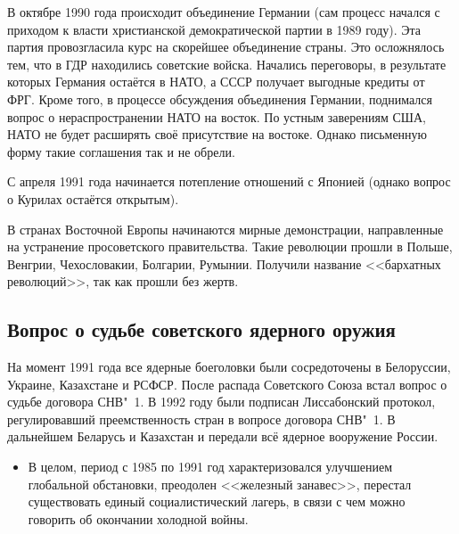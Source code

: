 В октябре 1990 года происходит объединение Германии (сам процесс начался с приходом к власти христианской демократической партии в 1989 году). Эта партия провозгласила курс на скорейшее объединение страны. Это осложнялось тем, что в ГДР находились советские войска. Начались переговоры, в результате которых Германия остаётся в НАТО, а СССР получает выгодные кредиты от ФРГ. Кроме того, в процессе обсуждения объединения Германии, поднимался вопрос о нераспространении НАТО на восток. По устным заверениям США, НАТО не будет расширять своё присутствие на востоке. Однако письменную форму такие соглашения так и не обрели. 

С апреля 1991 года начинается потепление отношений с Японией (однако вопрос о Курилах остаётся открытым). 

В странах Восточной Европы начинаются мирные демонстрации, направленные на устранение просоветского правительства. Такие революции прошли в Польше, Венгрии, Чехословакии, Болгарии, Румынии. Получили название <<бархатных революций>>, так как прошли без жертв.

\subsection{Вопрос о судьбе советского ядерного оружия}

На момент 1991 года все ядерные боеголовки были сосредоточены в Белоруссии, Украине, Казахстане и РСФСР. После распада Советского Союза встал вопрос о судьбе договора СНВ"~1. В 1992 году были подписан Лиссабонский протокол, регулировавший преемственность стран в вопросе договора СНВ"~1. В дальнейшем Беларусь и Казахстан и передали всё ядерное вооружение России. 

\vspace{0.5cm}
\begin{itemize}
    \item[] В целом, период с 1985 по 1991 год характеризовался улучшением глобальной обстановки, преодолен <<железный занавес>>, перестал существовать единый социалистический лагерь, в связи с чем можно говорить об окончании холодной войны. 
\end{itemize}
